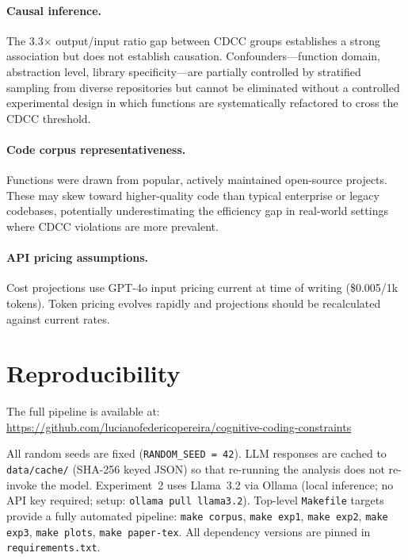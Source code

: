 \documentclass[11pt,a4paper]{article}
\begin{document}
\paragraph{Causal inference.}
The 3.3$\times$ output/input ratio gap between CDCC groups establishes a
strong association but does not establish causation. Confounders---function
domain, abstraction level, library specificity---are partially controlled
by stratified sampling from diverse repositories but cannot be eliminated
without a controlled experimental design in which functions are systematically
refactored to cross the CDCC threshold.

\paragraph{Code corpus representativeness.}
Functions were drawn from popular, actively maintained open-source projects.
These may skew toward higher-quality code than typical enterprise or legacy
codebases, potentially underestimating the efficiency gap in real-world settings
where CDCC violations are more prevalent.

\paragraph{API pricing assumptions.}
Cost projections use GPT-4o input pricing current at time of writing
(\$0.005/1k tokens). Token pricing evolves rapidly and projections should
be recalculated against current rates.

\section{Reproducibility}

The full pipeline is available at:\\
\url{https://github.com/lucianofedericopereira/cognitive-coding-constraints}

All random seeds are fixed (\texttt{RANDOM\_SEED = 42}). LLM responses are
cached to \texttt{data/cache/} (SHA-256 keyed JSON) so that re-running the
analysis does not re-invoke the model. Experiment~2 uses Llama~3.2 via
Ollama (local inference; no API key required; setup: \texttt{ollama pull
llama3.2}). Top-level \texttt{Makefile} targets provide a fully automated
pipeline: \texttt{make corpus}, \texttt{make exp1}, \texttt{make exp2},
\texttt{make exp3}, \texttt{make plots}, \texttt{make paper-tex}.
All dependency versions are pinned in \texttt{requirements.txt}.
\end{document}
